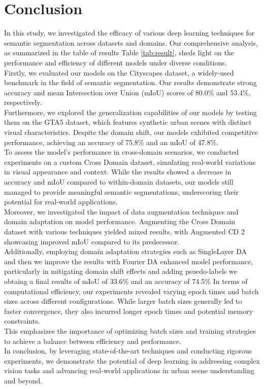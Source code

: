 \documentclass[10pt,twocolumn,letterpaper]{article}
\begin{document}
\section{Conclusion}

In this study, we investigated the efficacy of various deep learning techniques for semantic segmentation across datasets and domains. Our comprehensive analysis, as summarized in the table of results Table \ref{tab:result}, sheds light on the performance and efficiency of different models under diverse conditions.\\
Firstly, we evaluated our models on the Cityscapes dataset, a widely-used benchmark in the field of semantic segmentation. Our results demonstrate strong accuracy and mean Intersection over Union (mIoU) scores of 80.0\% and 53.4\%, respectively.\\
Furthermore, we explored the generalization capabilities of our models by testing them on the GTA5 dataset, which features synthetic urban scenes with distinct visual characteristics. Despite the domain shift, our models exhibited competitive performance, achieving an accuracy of 75.8\% and an mIoU of 47.8\%.\\
To assess the model's performance in cross-domain scenarios, we conducted experiments on a custom Cross Domain dataset, simulating real-world variations in visual appearance and context. While the results showed a decrease in accuracy and mIoU compared to within-domain datasets, our models still managed to provide meaningful semantic segmentations, underscoring their potential for real-world applications.\\
Moreover, we investigated the impact of data augmentation techniques and domain adaptation on model performance. Augmenting the Cross Domain dataset with various techniques yielded mixed results, with Augmented CD 2 showcasing improved mIoU compared to its predecessor. \\
Additionally, employing domain adaptation strategies such as SingleLayer DA and then we improve the results with Fourier DA enhanced model performance, particularly in mitigating domain shift effects and adding psuedo-labels we obtaing a final results of mIoU of 33.6\% and an accuracy of 74.5\%
In terms of computational efficiency, our experiments revealed varying epoch times and batch sizes across different configurations. While larger batch sizes generally led to faster convergence, they also incurred longer epoch times and potential memory constraints. \\
This emphasizes the importance of optimizing batch sizes and training strategies to achieve a balance between efficiency and performance.\\
In conclusion, by leveraging state-of-the-art techniques and conducting rigorous experiments, we demonstrate the potential of deep learning in addressing complex vision tasks and advancing real-world applications in urban scene understanding and beyond.



{\small



}
\end{document}
